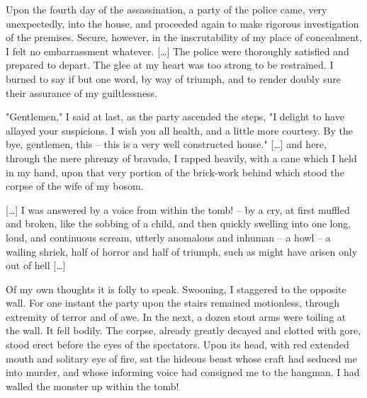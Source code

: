 \documentclass[11pt,a4paper]{article}
\begin{document}
Upon the fourth day of the assassination, a party of the police came, very unexpectedly, into the house, and proceeded again to make rigorous investigation of the premises. Secure, however, in the inscrutability of my place of concealment, I felt no embarrassment whatever. […] The police were thoroughly satisfied and prepared to depart. The glee at my heart was too strong to be restrained. I burned to say if but one word, by way of triumph, and to render doubly sure their assurance of my guiltlessness.

"Gentlemen," I said at last, as the party ascended the steps, "I delight to have allayed your suspicions. I wish you all health, and a little more courtesy. By the bye, gentlemen, this -- this is a very well constructed house." […] and here, through the mere phrenzy of bravado, I rapped heavily, with a cane which I held in my hand, upon that very portion of the brick-work behind which stood the corpse of the wife of my bosom.

[…] I was answered by a voice from within the tomb! -- by a cry, at first muffled and broken, like the sobbing of a child, and then quickly swelling into one long, loud, and continuous scream, utterly anomalous and inhuman -- a howl -- a wailing shriek, half of horror and half of triumph, such as might have arisen only out of hell […] 

Of my own thoughts it is folly to speak. Swooning, I staggered to the opposite wall. For one instant the party upon the stairs remained motionless, through extremity of terror and of awe. In the next, a dozen stout arms were toiling at the wall. It fell bodily. The corpse, already greatly decayed and clotted with gore, stood erect before the eyes of the spectators. Upon its head, with red extended mouth and solitary eye of fire, sat the hideous beast whose craft had seduced me into murder, and whose informing voice had consigned me to the hangman. I had walled the monster up within the tomb!
\end{document}

